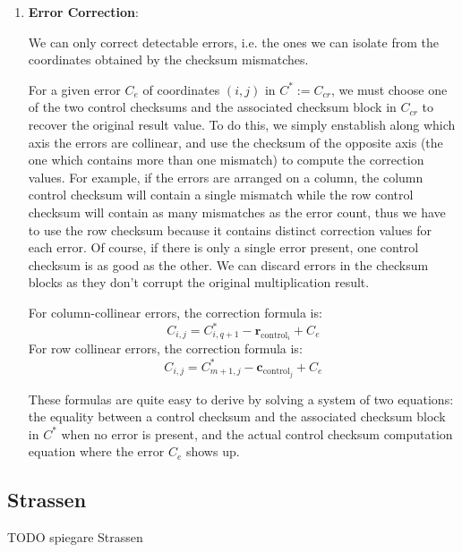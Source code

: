 \begin{enumerate}



  \item \textbf{Error Correction}:

    We can only correct detectable errors, i.e. the ones we can isolate from the coordinates obtained by the checksum mismatches.

    For a given error $C_e$ of coordinates $(i,j)$ in $C^* := C_{cr}$, we must choose one of the two control checksums and the associated checksum block in $C_{cr}$ to recover the original result value.
    To do this, we simply enstablish along which axis the errors are collinear, and use the checksum of the opposite axis (the one which contains more than one mismatch) to compute the correction values.
    For example, if the errors are arranged on a column, the column control checksum will contain a single mismatch while the row control checksum will contain as many mismatches as the error count, thus we have to use the row checksum because it contains distinct correction values for each error.
    Of course, if there is only a single error present, one control checksum is as good as the other.
    We can discard errors in the checksum blocks as they don't corrupt the original multiplication result.

    For column-collinear errors, the correction formula is:
    \[
      C_{i,j} = C^*_{i,q+1} - \mathbf{r}_{\text{control}_{i}} + C_e
    \]
    For row collinear errors, the correction formula is:
    \[
      C_{i,j} = C^*_{m+1,j} - \mathbf{c}_{\text{control}_{j}} + C_e
    \]

    These formulas are quite easy to derive by solving a system of two equations:
    the equality between a control checksum and the associated checksum block in $C^*$ when no error is present,
    and the actual control checksum computation equation where the error $C_e$ shows up.

\end{enumerate}

\subsection{Strassen}

TODO spiegare Strassen
